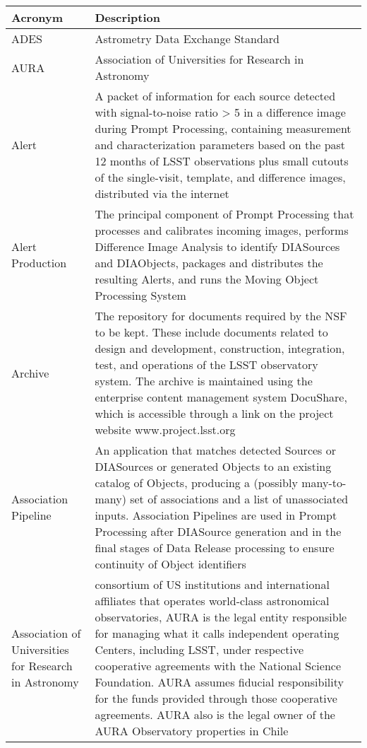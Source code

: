 \addtocounter{table}{-1}
\begin{longtable}{|p{}|p{}|}\hline
\textbf{Acronym} & \textbf{Description}  \\\hline

ADES & Astrometry Data Exchange Standard \\\hline
AURA & \gls{Association of Universities for Research in Astronomy} \\\hline
Alert & A packet of information for each source detected with signal-to-noise ratio > 5 in a difference image during \gls{Prompt Processing}, containing measurement and characterization parameters based on the past 12 months of \gls{LSST} observations plus small cutouts of the single-visit, template, and difference images, distributed via the internet \\\hline
Alert Production & The principal component of \gls{Prompt Processing} that processes and calibrates incoming images, performs \gls{Difference Image} Analysis to identify DIASources and DIAObjects, packages and distributes the resulting Alerts, and runs the Moving \gls{Object} Processing System \\\hline
Archive & The repository for documents required by the \gls{NSF} to be kept. These include documents related to design and development, construction, integration, test, and operations of the \gls{LSST} observatory system. The archive is maintained using the enterprise content management system \gls{DocuShare}, which is accessible through a link on the project website www.project.lsst.org \\\hline
Association Pipeline & An application that matches detected Sources or DIASources or generated Objects to an existing catalog of Objects, producing a (possibly many-to-many) set of associations and a list of unassociated inputs. Association Pipelines are used in \gls{Prompt Processing} after \gls{DIASource} generation and in the final stages of \gls{Data Release} processing to ensure continuity of \gls{Object} identifiers \\\hline
Association of Universities for Research in Astronomy &  consortium of \gls{US} institutions and international affiliates that operates world-class astronomical observatories, \gls{AURA} is the legal entity responsible for managing what it calls independent operating Centers, including \gls{LSST}, under respective cooperative agreements with the \gls{National Science Foundation}. \gls{AURA} assumes fiducial responsibility for the funds provided through those cooperative agreements. \gls{AURA} also is the legal owner of the \gls{AURA} Observatory properties in Chile \\\hline

\end{longtable}
